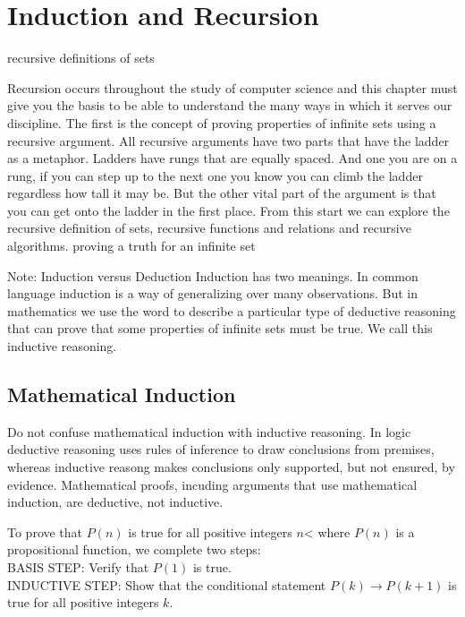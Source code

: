 


\chapter {Induction and Recursion}
recursive definitions of sets

Recursion occurs throughout the study of computer science and this chapter must give you the basis to be able to understand the many ways in which it serves our discipline. The first is the concept of proving properties of infinite sets using a recursive argument. All recursive arguments have two parts that have the ladder as a metaphor. Ladders have rungs that are equally spaced. And one you are on a rung, if you can step up to the next one you know you can climb the ladder regardless how tall it may be. But the other vital part of the argument is that you can get onto the ladder in the first place. From this start we can explore the recursive definition of sets, recursive functions and relations and recursive algorithms. 
proving a truth for an infinite set


Note: Induction versus Deduction
Induction has two meanings. In common language induction is a way of generalizing over many observations. But in mathematics we use the word to describe a particular type of deductive reasoning that can prove that some properties of infinite sets must be true. We call this inductive reasoning. 



\section {Mathematical Induction}
\begin{notes}
Do not confuse mathematical induction with inductive reasoning. In logic deductive reasoning uses rules of inference to draw conclusions from premises, whereas inductive reasong makes conclusions only supported, but not ensured, by evidence. Mathematical proofs, incuding arguments that use mathematical induction, are deductive, not inductive.
\end{notes}

\begin{definition}
To prove that $P(n)$ is true for all positive integers $n$< where $P(n)$ is a propositional function, we complete two steps: \\
BASIS STEP: Verify that $P(1)$ is true.\\
INDUCTIVE STEP: Show that the conditional statement $P(k) \rightarrow P(k+1)$ is true for all positive integers $k$.
\end{definition}
 
